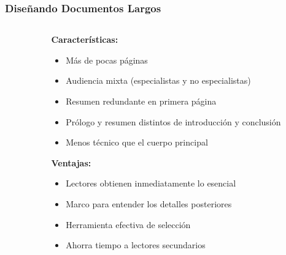 \documentclass{beamer}
\begin{document}
\begin{frame}
\frametitle{Diseñando Documentos Largos}

\begin{columns}
\begin{column}{0.35\textwidth}
\end{column}

\begin{column}{0.6\textwidth}
\textbf{Características:}
\begin{itemize}
    \item Más de pocas páginas
    \item Audiencia mixta (especialistas y no especialistas)
    \item Resumen redundante en primera página
    \item Prólogo y resumen distintos de introducción y conclusión
    \item Menos técnico que el cuerpo principal
\end{itemize}

\vspace{0.3cm}
\textbf{Ventajas:}
\begin{itemize}
    \item Lectores obtienen inmediatamente lo esencial
    \item Marco para entender los detalles posteriores
    \item Herramienta efectiva de selección
    \item Ahorra tiempo a lectores secundarios
\end{itemize}
\end{column}
\end{columns}
\end{frame}
\end{document}
